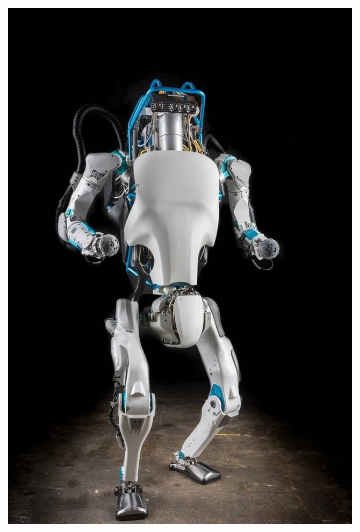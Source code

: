 \begin{figure}
  \centering
  \begin{subfigure}[b]{0.4\textwidth}
    \includegraphics[width=\textwidth]{figures/ATLAS.jpg}
    \caption{}
    \label{fig:atlas}
  \end{subfigure}
  \begin{subfigure}[b]{0.4\textwidth}

\end{subfigure}
\end{figure}
